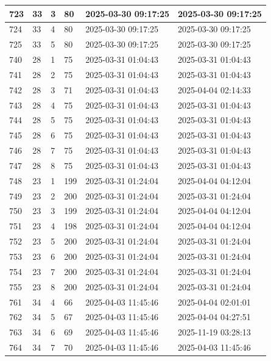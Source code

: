 \begin{longtable}{|l|l|l|l|l|l|}
723 & 33 & 3 & 80 & 2025-03-30 09:17:25 & 2025-03-30 09:17:25 \\ \hline 
724 & 33 & 4 & 80 & 2025-03-30 09:17:25 & 2025-03-30 09:17:25 \\ \hline 
725 & 33 & 5 & 80 & 2025-03-30 09:17:25 & 2025-03-30 09:17:25 \\ \hline 
740 & 28 & 1 & 75 & 2025-03-31 01:04:43 & 2025-03-31 01:04:43 \\ \hline 
741 & 28 & 2 & 75 & 2025-03-31 01:04:43 & 2025-03-31 01:04:43 \\ \hline 
742 & 28 & 3 & 71 & 2025-03-31 01:04:43 & 2025-04-04 02:14:33 \\ \hline 
743 & 28 & 4 & 75 & 2025-03-31 01:04:43 & 2025-03-31 01:04:43 \\ \hline 
744 & 28 & 5 & 75 & 2025-03-31 01:04:43 & 2025-03-31 01:04:43 \\ \hline 
745 & 28 & 6 & 75 & 2025-03-31 01:04:43 & 2025-03-31 01:04:43 \\ \hline 
746 & 28 & 7 & 75 & 2025-03-31 01:04:43 & 2025-03-31 01:04:43 \\ \hline 
747 & 28 & 8 & 75 & 2025-03-31 01:04:43 & 2025-03-31 01:04:43 \\ \hline 
748 & 23 & 1 & 199 & 2025-03-31 01:24:04 & 2025-04-04 04:12:04 \\ \hline 
749 & 23 & 2 & 200 & 2025-03-31 01:24:04 & 2025-03-31 01:24:04 \\ \hline 
750 & 23 & 3 & 199 & 2025-03-31 01:24:04 & 2025-04-04 04:12:04 \\ \hline 
751 & 23 & 4 & 198 & 2025-03-31 01:24:04 & 2025-04-04 04:12:04 \\ \hline 
752 & 23 & 5 & 200 & 2025-03-31 01:24:04 & 2025-03-31 01:24:04 \\ \hline 
753 & 23 & 6 & 200 & 2025-03-31 01:24:04 & 2025-03-31 01:24:04 \\ \hline 
754 & 23 & 7 & 200 & 2025-03-31 01:24:04 & 2025-03-31 01:24:04 \\ \hline 
755 & 23 & 8 & 200 & 2025-03-31 01:24:04 & 2025-03-31 01:24:04 \\ \hline 
761 & 34 & 4 & 66 & 2025-04-03 11:45:46 & 2025-04-04 02:01:01 \\ \hline 
762 & 34 & 5 & 67 & 2025-04-03 11:45:46 & 2025-04-04 04:27:51 \\ \hline 
763 & 34 & 6 & 69 & 2025-04-03 11:45:46 & 2025-11-19 03:28:13 \\ \hline 
764 & 34 & 7 & 70 & 2025-04-03 11:45:46 & 2025-04-03 11:45:46 \\ \hline 

\end{longtable}
